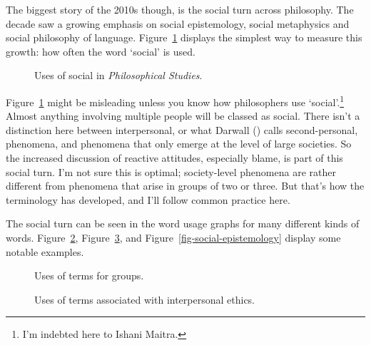 \documentclass[
  10pt,
  letterpaper,
  DIV=11,
  numbers=noendperiod,
  twoside]{scrartcl}
\begin{document}
The biggest story of the 2010s though, is the social turn across
philosophy. The decade saw a growing emphasis on social epistemology,
social metaphysics and social philosophy of language.
Figure~\ref{fig-social} displays the simplest way to measure this
growth: how often the word `social' is used.

\begin{figure}


\caption{\label{fig-social}Uses of social in \emph{Philosophical
Studies}.}

\end{figure}%

Figure~\ref{fig-social} might be misleading unless you know how
philosophers use `social'.\footnote{I'm indebted here to Ishani Maitra.}
Almost anything involving multiple people will be classed as social.
There isn't a distinction here between interpersonal, or what Darwall
() calls second-personal, phenomena, and
phenomena that only emerge at the level of large societies. So the
increased discussion of reactive attitudes, especially blame, is part of
this social turn. I'm not sure this is optimal; society-level phenomena
are rather different from phenomena that arise in groups of two or
three. But that's how the terminology has developed, and I'll follow
common practice here.

The social turn can be seen in the word usage graphs for many different
kinds of words. Figure~\ref{fig-social-general},
Figure~\ref{fig-social-ethics}, and Figure~\ref{fig-social-epistemology}
display some notable examples.

\begin{figure}


\caption{\label{fig-social-general}Uses of terms for groups.}

\end{figure}%

\begin{figure}


\caption{\label{fig-social-ethics}Uses of terms associated with
interpersonal ethics.}

\end{figure}%
\end{document}
